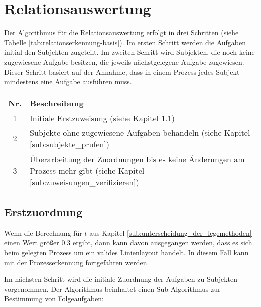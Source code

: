 \section{Relationsauswertung} %
\label{sub:relationsauswertung}
Der Algorithmus für die Relationsauswertung erfolgt in drei Schritten (siehe Tabelle \ref{tab:relationserkennung-basis}). Im ersten Schritt werden die Aufgaben initial den Subjekten zugeteilt. Im zweiten Schritt wird Subjekten, die noch keine zugewiesene Aufgabe besitzen, die jeweils nächstgelegene Aufgabe zugewiesen. Dieser Schritt basiert auf der Annahme, dass in einem Prozess jedes Subjekt mindestens eine Aufgabe ausführen muss.

\begin{center}
	\label{tab:relationserkennung-basis}
	\begin{tabularx}
		{1.0\linewidth}{ c X } \textbf{Nr.} & \textbf{Beschreibung} \\
		\hline 1 & Initiale Erstzuweisung (siehe Kapitel \ref{sub:erstzuordnung}) \\
		\hline 2 & Subjekte ohne zugewiesene Aufgaben behandeln (siehe Kapitel \ref{sub:subjekte_prufen}) \\
		\hline 3 & Überarbeitung der Zuordnungen bis es keine Änderungen am Prozess mehr gibt (siehe Kapitel \ref{sub:zuweisungen_verifizieren})\\
	\end{tabularx}
\end{center}

\subsection{Erstzuordnung} %
\label{sub:erstzuordnung}
Wenn die Berechnung für $t$ aus Kapitel \ref{sub:unterscheidung_der_legemethoden} einen Wert größer $0.3$ ergibt, dann kann davon ausgegangen werden, dass es sich beim gelegten Prozess um ein valides Linienlayout handelt. In diesem Fall kann mit der Prozesserkennung fortgefahren werden.

Im nächsten Schritt wird die initiale Zuordnung der Aufgaben zu Subjekten vorgenommen. Der Algorithmus beinhaltet einen Sub-Algorithmus zur Bestimmung von Folgeaufgaben:
 
